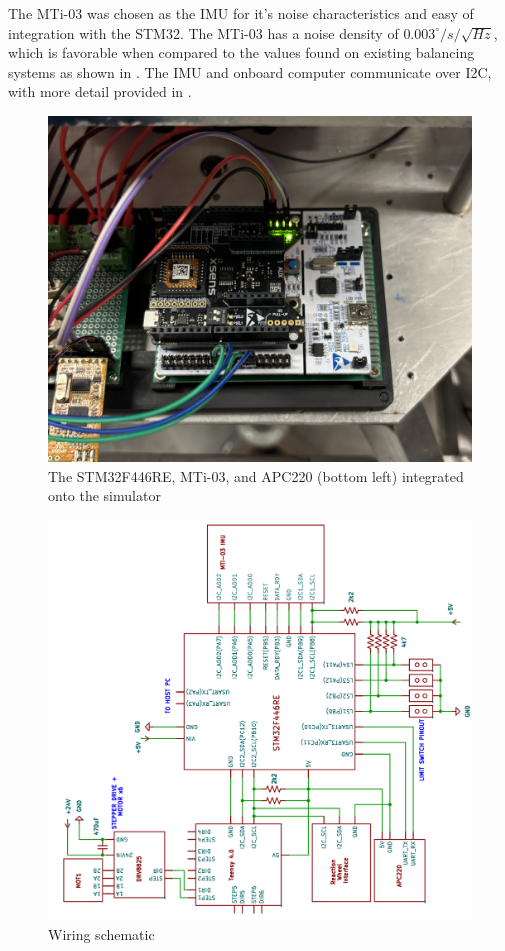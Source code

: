 The MTi-03 was chosen as the IMU for it's noise characteristics and easy of integration with the STM32. The MTi-03 has a noise density of $0.003^{\circ}/s/\sqrt{Hz}$, which is favorable when compared to the values found on existing balancing systems as shown in . The IMU and onboard computer communicate over I2C, with more detail provided in .





\begin{figure}[h]\label{fig:OBC}
    \centering
    \includegraphics[width=0.80\linewidth]{figures/OBC.jpg}
    \caption{The STM32F446RE, MTi-03, and APC220 (bottom left) integrated onto the simulator}

\end{figure}


\begin{figure}[h]\label{fig:wiring}
    \centering
    \includegraphics[width=0.95\linewidth,angle=-90]{figures/wiring.png}
    \caption{Wiring schematic}
\end{figure}




